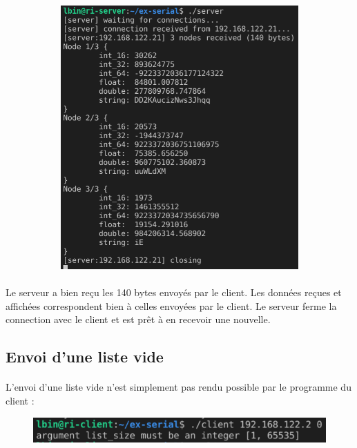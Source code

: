 \documentclass{article}
\begin{document}
\begin{figure}[H]
\begin{subfigure}[b]{.48\textwidth}
            \includegraphics[width=.98\textwidth]{./screenshots/server-test-simple.png}
        \end{subfigure}
    \end{figure}

    \paragraph{}
    Le serveur a bien reçu les 140 bytes envoyés par le client. Les données reçues et affichées correspondent bien à celles envoyées par le client. Le serveur ferme la connection avec le client et est prêt à en recevoir une nouvelle.

    \subsection{Envoi d'une liste vide}
    \paragraph{}
    L'envoi d'une liste vide n'est simplement pas rendu possible par le programme du client :
    \begin{figure}[H]
        \centering
        \includegraphics[width=.45\linewidth]{./screenshots/client-test-0.png}
    \end{figure}
\end{document}
